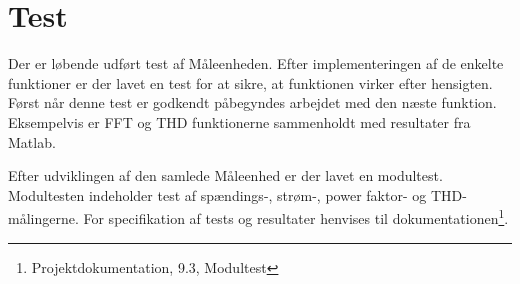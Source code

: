 
\section{Test}

Der er løbende udført test af Måleenheden. Efter implementeringen af de enkelte funktioner er der lavet en test for at sikre, at funktionen virker efter hensigten. Først når denne test er godkendt påbegyndes arbejdet med den næste funktion. Eksempelvis er FFT og THD funktionerne sammenholdt med resultater fra Matlab. 

Efter udviklingen af den samlede Måleenhed er der lavet en modultest. Modultesten indeholder test af spændings-, strøm-, power faktor- og THD-målingerne. For specifikation af tests og resultater henvises til dokumentationen\footnote{Projektdokumentation, 9.3, Modultest}.


